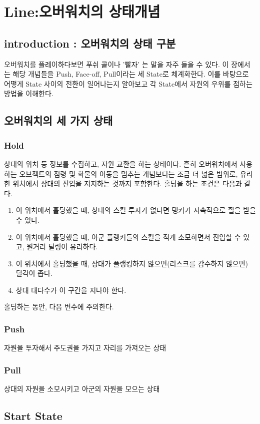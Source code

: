 \chapter{Line:오버워치의 상태개념}{\label{sec:state}}
\section{introduction : 오버워치의 상태 구분}
오버워치를 플레이하다보면 푸쉬 콜이나 '빨자' 는 말을 자주 들을 수 있다. 이 장에서는 해당 개념들을 Push, Face-off, Pull이라는 세 State로 체계화한다. 이를 바탕으로 어떻게 State 사이의 전환이 일어나는지 알아보고 각 State에서 자원의 우위를 점하는 방법을 이해한다.
\section{오버워치의 세 가지 상태}

\subsection{Hold}
상대의 위치 등 정보를 수집하고, 자원 교환을 하는 상태이다. 흔히 오버워치에서 사용하는 오브젝트의 점령 및 화물의 이동을 멈추는 개념보다는 조금 더 넓은 범위로, 유리한 위치에서 상대의 진입을 저지하는 것까지 포함한다. 
홀딩을 하는 조건은 다음과 같다.
\begin{enumerate}
    \item 이 위치에서 홀딩했을 때, 상대의 스킬 투자가 없다면 탱커가 지속적으로 힐을 받을 수 있다.
    \item 이 위치에서 홀딩했을 때, 아군 플랭커들의 스킬을 적게 소모하면서 진입할 수 있고, 원거리 딜링이 유리하다.
    \item 이 위치에서 홀딩했을 때, 상대가 플랭킹하지 않으면(리스크를 감수하지 않으면) 딜각이 좁다.
    \item 상대 대다수가 이 구간을 지나야 한다.
\end{enumerate}
홀딩하는 동안, 다음 변수에 주의한다.
\subsection{Push}
자원을 투자해서 주도권을 가지고 자리를 가져오는 상태
\subsection{Pull}
상대의 자원을 소모시키고 아군의 자원을 모으는 상태
\section{Start State}
